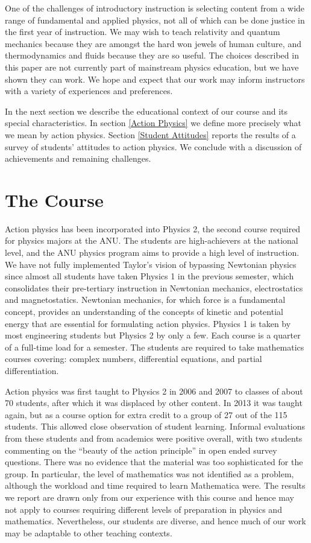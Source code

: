 \documentclass[prb,oncolumn,12pt]{revtex4-2}
\begin{document}
One of the challenges of introductory instruction is selecting content from a wide range of fundamental and applied physics, not all of which can be done justice in the first year of instruction. We may wish to teach relativity and quantum mechanics because they are amongst the hard won jewels of human culture, and thermodynamics and fluids because they are so useful. The choices described in this paper are not currently part of mainstream physics education, but we have shown they can work. We hope and expect that our work may inform instructors with a variety of experiences and preferences.

In the next section we describe the educational context of our course and its special characteristics. In section \ref{Action Physics} we define more precisely what we mean by action physics. Section \ref{Student Attitudes} reports the results of a survey of students' attitudes to action physics. We conclude with a discussion of achievements and remaining challenges. 


\section{The Course}
\label{The Course}

Action physics has been incorporated into Physics 2, the second course required for physics majors at the ANU. \cite{phys1201}  The students are high-achievers at the national level, and the ANU physics program aims to provide a high level of instruction. \cite{PECMission} We have not fully implemented Taylor's vision of bypassing Newtonian physics since almost all students have taken Physics 1 in the previous semester, which consolidates their pre-tertiary instruction in Newtonian mechanics, electrostatics and magnetostatics. \cite{phys1101}  Newtonian mechanics, for which force is a fundamental concept, provides an understanding of the concepts of kinetic and potential energy that are essential for formulating action physics. Physics 1 is taken by most engineering students but Physics 2 by only a few. Each course is a quarter of a full-time load for a semester. The students are required to take mathematics courses covering: complex numbers, differential equations, and partial differentiation.

Action physics was first taught to Physics 2 in 2006 and 2007 to classes of about 70 students, after which it was displaced by other content. In 2013 it was taught again, but as a course option for extra credit to a group of 27 out of the 115 students. This allowed close observation of student learning. Informal evaluations from these students and from academics were positive overall, with two students commenting on the ``beauty of the action principle'' in open ended survey questions. There was no evidence that the material was too sophisticated for the group. In particular, the level of mathematics was not identified as a problem, although the workload and time required to learn Mathematica were. The results we report are drawn only from our experience with this course and hence may not apply to courses requiring different levels of preparation in physics and mathematics. Nevertheless, our students are diverse, and hence much of our work may be adaptable to other teaching contexts.
\end{document}
